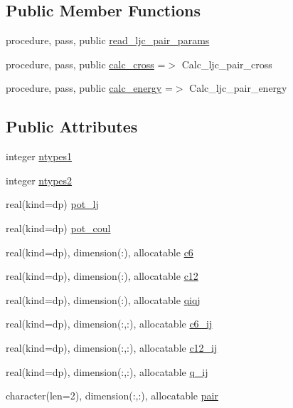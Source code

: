 \subsection*{Public Member Functions}
\begin{DoxyCompactItemize}
\item 
procedure, pass, public \hyperlink{structmod__pot__ljc__pair_1_1ljc__pair__dimer_ac0eca17892ab567ada4547be171df9a2}{read\+\_\+ljc\+\_\+pair\+\_\+params}
\item 
procedure, pass, public \hyperlink{structmod__pot__ljc__pair_1_1ljc__pair__dimer_af138cf6a72055b2d280b08598853bfd9}{calc\+\_\+cross} =$>$ Calc\+\_\+ljc\+\_\+pair\+\_\+cross
\item 
procedure, pass, public \hyperlink{structmod__pot__ljc__pair_1_1ljc__pair__dimer_adc6d1f69b54f1485cbb107e3c78ac867}{calc\+\_\+energy} =$>$ Calc\+\_\+ljc\+\_\+pair\+\_\+energy
\end{DoxyCompactItemize}
\subsection*{Public Attributes}
\begin{DoxyCompactItemize}
\item 
integer \hyperlink{structmod__pot__ljc__pair_1_1ljc__pair__dimer_a4a68dac77dd1c7f96844091b52a9b1c9}{ntypes1}
\item 
integer \hyperlink{structmod__pot__ljc__pair_1_1ljc__pair__dimer_aff17dd61954cd4c01b6bfa2456715e42}{ntypes2}
\item 
real(kind=dp) \hyperlink{structmod__pot__ljc__pair_1_1ljc__pair__dimer_aa059e9bbab66781bdaefb9add46a50ff}{pot\+\_\+lj}
\item 
real(kind=dp) \hyperlink{structmod__pot__ljc__pair_1_1ljc__pair__dimer_accfab892d2dee33d1357dba151d13c13}{pot\+\_\+coul}
\item 
real(kind=dp), dimension(\+:), allocatable \hyperlink{structmod__pot__ljc__pair_1_1ljc__pair__dimer_ab69991396c9df5b38ee1db8babb5f944}{c6}
\item 
real(kind=dp), dimension(\+:), allocatable \hyperlink{structmod__pot__ljc__pair_1_1ljc__pair__dimer_acca7df653344e9c22e7ed71d83dfd2da}{c12}
\item 
real(kind=dp), dimension(\+:), allocatable \hyperlink{structmod__pot__ljc__pair_1_1ljc__pair__dimer_ab342f6ea50b777dd052fe2e8dceffc84}{qiqj}
\item 
real(kind=dp), dimension(\+:,\+:), allocatable \hyperlink{structmod__pot__ljc__pair_1_1ljc__pair__dimer_ad93bc567f5babc7535d21edc59c65887}{c6\+\_\+ij}
\item 
real(kind=dp), dimension(\+:,\+:), allocatable \hyperlink{structmod__pot__ljc__pair_1_1ljc__pair__dimer_a15e9c4efef63b3aa5992324ee98d4231}{c12\+\_\+ij}
\item 
real(kind=dp), dimension(\+:,\+:), allocatable \hyperlink{structmod__pot__ljc__pair_1_1ljc__pair__dimer_adcb10761fdd3124043f41b73732711cc}{q\+\_\+ij}
\item 
character(len=2), dimension(\+:,\+:), allocatable \hyperlink{structmod__pot__ljc__pair_1_1ljc__pair__dimer_a91a99dc498a74a26a622c4614e367dc9}{pair}
\end{DoxyCompactItemize}


